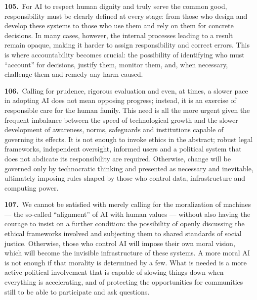 \documentclass{article}
\begin{document}
\textbf{105.}\ For AI to respect human dignity and truly serve the common good, responsibility must be clearly defined at every stage: from those who design and develop these systems to those who use them and rely on them for concrete decisions. In many cases, however, the internal processes leading to a result remain opaque, making it harder to assign responsibility and correct errors. This is where accountability becomes crucial: the possibility of identifying who must ``account'' for decisions, justify them, monitor them, and, when necessary, challenge them and remedy any harm caused.\cite{n127}

\textbf{106.}\ Calling for prudence, rigorous evaluation and even, at times, a slower pace in adopting AI does not mean opposing progress; instead, it is an exercise of responsible care for the human family. This need is all the more urgent given the frequent imbalance between the speed of technological growth and the slower development of awareness, norms, safeguards and institutions capable of governing its effects. It is not enough to invoke ethics in the abstract; robust legal frameworks, independent oversight, informed users and a political system that does not abdicate its responsibility are required. Otherwise, change will be governed only by technocratic thinking and presented as necessary and inevitable, ultimately imposing rules shaped by those who control data, infrastructure and computing power.

\textbf{107.}\ We cannot be satisfied with merely calling for the moralization of machines --- the so-called ``alignment'' of AI with human values --- without also having the courage to insist on a further condition: the possibility of openly discussing the ethical frameworks involved and subjecting them to shared standards of social justice. Otherwise, those who control AI will impose their own moral vision, which will become the invisible infrastructure of these systems. A more moral AI is not enough if that morality is determined by a few. What is needed is a more active political involvement that is capable of slowing things down when everything is accelerating, and of protecting the opportunities for communities still to be able to participate and ask questions.
\end{document}

